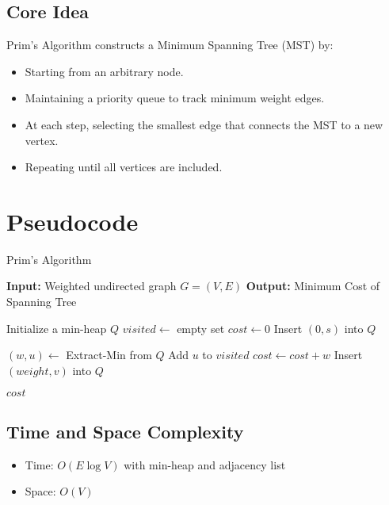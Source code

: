 \documentclass[a4paper,14pt]{extarticle}
\begin{document}
\subsection{Core Idea}
Prim's Algorithm constructs a Minimum Spanning Tree (MST) by:
\begin{itemize}
    \item Starting from an arbitrary node.
    \item Maintaining a priority queue to track minimum weight edges.
    \item At each step, selecting the smallest edge that connects the MST to a new vertex.
    \item Repeating until all vertices are included.
\end{itemize}

\section*{Pseudocode}

\begin{algorithm}[H]
\caption{Prim's Algorithm}
\begin{algorithmic}[1]
\State \textbf{Input:} Weighted undirected graph $G = (V, E)$
\State \textbf{Output:} Minimum Cost of Spanning Tree

    \State Initialize a min-heap $Q$
    \State $visited \gets$ empty set
    \State $cost \gets 0$
    \State Insert $(0, s)$ into $Q$ 

        \State $(w, u) \gets$ Extract-Min from $Q$
            \State Add $u$ to $visited$
            \State $cost \gets cost + w$
                    \State Insert $(weight, v)$ into $Q$
                \EndIf
            \EndFor
        \EndIf
    \EndWhile

    \State \Return $cost$
\EndFunction
\end{algorithmic}
\end{algorithm}

\subsection*{Time and Space Complexity}
\begin{itemize}
    \item Time: $O(E \log V)$ with min-heap and adjacency list
    \item Space: $O(V)$
\end{itemize}
\end{document}
